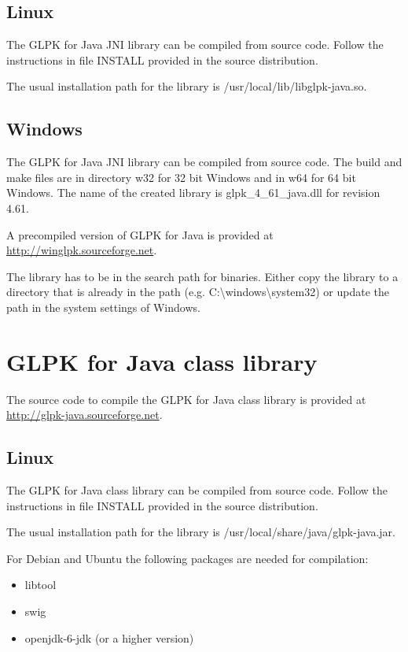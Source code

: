\documentclass[a4paper,11pt]{report}
\newcommand{\glpkVersionMajor}{4}
\newcommand{\glpkVersionMinor}{61}
\begin{document}
\subsection{Linux}
The GLPK for Java JNI library can be compiled from source code. Follow the instructions in file INSTALL provided in the source distribution.

The usual installation path for the library is /usr/local/lib/libglpk-java.so.
\subsection{Windows}
The GLPK for Java JNI library can be compiled from source code. The build and make files are in directory w32 for 32 bit Windows and in w64 for 64 bit Windows. The name of the created library is glpk\_\glpkVersionMajor\_\glpkVersionMinor\_java.dll for revision \glpkVersionMajor.\glpkVersionMinor.

A precompiled version of GLPK for Java is provided at \linebreak\href{http://winglpk.sourceforge.net}{http://winglpk.sourceforge.net}.

The library has to be in the search path for binaries. Either copy the library to a directory that is already in the path (e.g. C:\textbackslash windows\textbackslash system32) or update the path in the system settings of Windows.

\section{GLPK for Java class library}
The source code to compile the GLPK for Java class library is provided at \linebreak\href{http://glpk-java.sourceforge.net}{http://glpk-java.sourceforge.net}.

\subsection{Linux}
The GLPK for Java class library can be compiled from source code. Follow the instructions in file INSTALL provided in the source distribution.

The usual installation path for the library is /usr/local/share/java/glpk-java.jar.

For Debian and Ubuntu the following packages are needed for compilation:
\begin{itemize}
	\item libtool
	\item swig
	\item openjdk-6-jdk (or a higher version)
\end{itemize}
\end{document}
